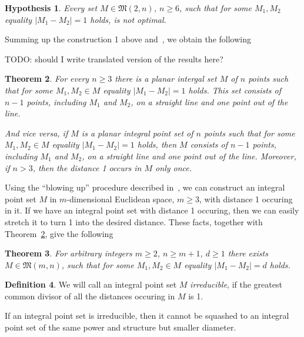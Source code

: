 \documentclass[a4paper,14pt]{article} %
\theoremstyle{plain}
\newtheorem{theorem}{Theorem}[section]
\newtheorem{hypothesis}[theorem]{Hypothesis}
\theoremstyle{definition}
\newtheorem{definition}[theorem]{Definition}
\begin{document}
\begin{hypothesis}
	Every set $M\in\mathfrak{M}(2,n)$, $n\geq 6$, such that for some $M_1,M_2$ equality $|M_1 - M_2|=1$ holds,
	is not optimal.
\end{hypothesis}



Summing up the construction 1 above and~\cite[lemma 3 and proposition 6]{our-vmmsh-2018},
we obtain the following

TODO: should I write translated version of the results here?

\begin{theorem}
	\label{thm:minimeter_1_planar}
	For every $n\geq 3$ there is a planar intergal set $M$ of $n$ points
	such that for some $M_1,M_2 \in M$ equality $|M_1 - M_2|=1$ holds.
	This set consists of $n-1$ points, including $M_1$ and $M_2$, on a straight line and one point out of the line.

	And vice versa, if $M$ is a planar integral point set of $n$ points
	such that for some $M_1,M_2 \in M$ equality $|M_1 - M_2|=1$ holds,
	then $M$ consists of $n-1$ points, including $M_1$ and $M_2$, on a straight line and one point out of the line.
	Moreover, if $n > 3$, then the distance 1 occurs in $M$ only once.
\end{theorem}

Using the ``blowing up'' procedure described in~\cite[theorem 1.3]{kurz2008bounds},
we can construct an integral point set $M$ in $m$-dimensional Euclidean space, $m\geq 3$,
with distance 1 occuring in it.
If we have an integral point set with distance 1 occuring,
then we can easily stretch it to turn 1 into the desired distance.
These facts, together with Theorem~\ref{thm:minimeter_1_planar}, give the following

\begin{theorem}
	For arbitrary integers $m \geq 2$, $n \geq m+1$, $d \geq 1$
	there exists $M\in\mathfrak{M}(m,n)$,
	such that for some $M_1, M_2\in M$ equality $|M_1 - M_2| = d$ holds.
\end{theorem}

\begin{definition}
	We will call an integral point set $M$ \textit{irreducible}, if the greatest common divisor
	of all the distances occuring in $M$ is 1.
\end{definition}

If an integral point set is irreducible,
then it cannot be squashed to an integral point set of the same power and structure but smaller diameter.
\end{document}
